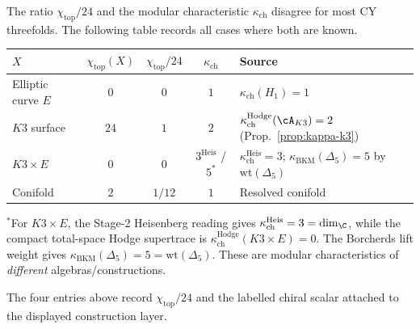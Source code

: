 \begin{proposition}[\texorpdfstring{$\chi/24 \neq \kappa_{\mathrm{ch}}$}{chi/24 != kappa-ch} in general]
\label{prop:chi-kappa-discrepancy}
The ratio $\chi_{\mathrm{top}}/24$ and the modular characteristic $\kappa_{\mathrm{ch}}$ disagree for most CY threefolds. The following table records all cases where both are known.
\begin{center}
\begin{tabular}{lcccl}
\toprule
$X$ & $\chi_{\mathrm{top}}(X)$ & $\chi_{\mathrm{top}}/24$ & $\kappa_{\mathrm{ch}}$ & Source \\
\midrule
Elliptic curve $E$ & $0$ & $0$ & $1$ & $\kappa_{\mathrm{ch}}(H_1) = 1$ \\
$K3$ surface & $24$ & $1$ & $2$ & $\kappa_{\mathrm{ch}}^{\mathrm{Hodge}}(\cA_{K3}) = 2$ (Prop.~\ref{prop:kappa-k3}) \\
$K3 \times E$ & $0$ & $0$ & $3^{\mathrm{Heis}}$ / $5^*$ & $\kappa_{\mathrm{ch}}^{\mathrm{Heis}} = 3$; $\kappa_{\mathrm{BKM}}(\Delta_5) = 5$ by $\mathrm{wt}(\Delta_5)$ \\
Conifold & $2$ & $1/12$ & $1$ & Resolved conifold \\
\bottomrule
\end{tabular}
\end{center}
\noindent{}${}^*$For $K3 \times E$, the Stage-2 Heisenberg reading gives $\kappa_{\mathrm{ch}}^{\mathrm{Heis}} = 3 = \dim_\C$, while the compact total-space Hodge supertrace is $\kappa_{\mathrm{ch}}^{\mathrm{Hodge}}(K3\times E)=0$. The Borcherds lift weight gives $\kappa_{\mathrm{BKM}}(\Delta_5) = 5 = \mathrm{wt}(\Delta_5)$. These are modular characteristics of \emph{different} algebras/constructions.

\smallskip\noindent The four entries above record $\chi_{\mathrm{top}}/24$ and the labelled chiral scalar attached to the displayed construction layer.
\end{proposition}

